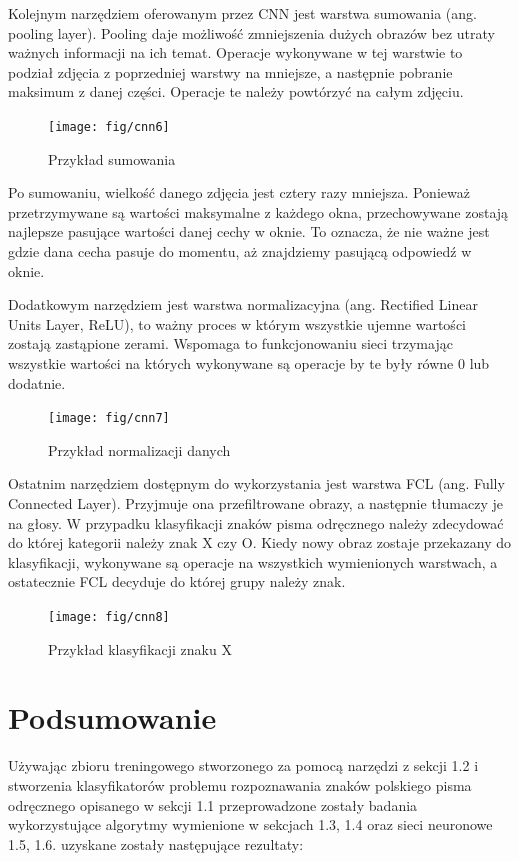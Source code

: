 \documentclass[brudnopis]{xmgr}
\begin{document}
Kolejnym narzędziem oferowanym przez CNN jest warstwa sumowania (ang. pooling layer). Pooling daje możliwość zmniejszenia dużych obrazów bez utraty ważnych informacji na ich temat. Operacje wykonywane w tej warstwie to podział zdjęcia z poprzedniej warstwy na mniejsze, a następnie pobranie maksimum z danej części. Operacje te należy powtórzyć na całym zdjęciu.


\begin{figure}[!tbh]
\centering
\texttt{[image: fig/cnn6]}
\caption{Przykład sumowania}
\end{figure}

Po sumowaniu, wielkość danego zdjęcia jest cztery razy mniejsza. Ponieważ przetrzymywane są wartości maksymalne z każdego okna, przechowywane zostają najlepsze pasujące wartości danej cechy w oknie. To oznacza, że nie ważne jest gdzie dana cecha pasuje do momentu, aż znajdziemy pasującą odpowiedź w oknie.

Dodatkowym narzędziem jest warstwa normalizacyjna (ang. Rectified Linear Units Layer, ReLU), to ważny proces w którym wszystkie ujemne wartości zostają zastąpione zerami. Wspomaga to funkcjonowaniu sieci trzymając wszystkie wartości na których wykonywane są operacje by te były równe 0 lub dodatnie.

\begin{figure}[!tbh]
\centering
\texttt{[image: fig/cnn7]}
\caption{Przykład normalizacji danych}
\end{figure}
\newpage

Ostatnim narzędziem dostępnym do wykorzystania jest warstwa FCL (ang. Fully Connected Layer). Przyjmuje ona przefiltrowane obrazy, a następnie tłumaczy je na głosy. W przypadku klasyfikacji znaków pisma odręcznego należy zdecydować do której kategorii należy znak X czy O. Kiedy nowy obraz zostaje przekazany do klasyfikacji, wykonywane są operacje na wszystkich wymienionych warstwach, a ostatecznie FCL decyduje do której grupy należy znak.

\begin{figure}[!tbh]
\centering
\texttt{[image: fig/cnn8]}
\caption{Przykład klasyfikacji znaku X}
\end{figure}
\clearpage

\section{Podsumowanie}

Używając zbioru treningowego stworzonego za pomocą narzędzi z sekcji 1.2 i stworzenia klasyfikatorów problemu rozpoznawania znaków polskiego pisma odręcznego opisanego w sekcji 1.1 przeprowadzone zostały badania wykorzystujące algorytmy wymienione w sekcjach 1.3, 1.4 oraz sieci neuronowe 1.5, 1.6. uzyskane zostały następujące rezultaty:
\end{document}

